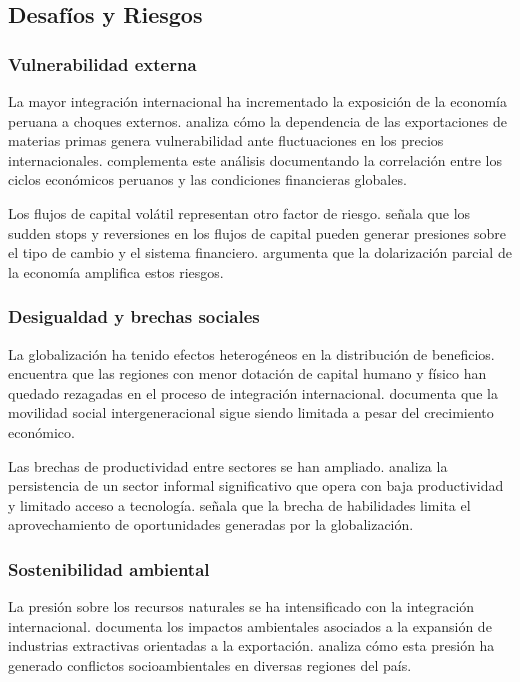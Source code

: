 \documentclass[12pt, a4paper]{article}
\begin{document}
\subsection{Desafíos y Riesgos}

\subsubsection{Vulnerabilidad externa}
La mayor integración internacional ha incrementado la exposición de la economía peruana a choques externos. \textcite{mendoza2021volatilidad} analiza cómo la dependencia de las exportaciones de materias primas genera vulnerabilidad ante fluctuaciones en los precios internacionales. \textcite{jimenez2020ciclos} complementa este análisis documentando la correlación entre los ciclos económicos peruanos y las condiciones financieras globales.

Los flujos de capital volátil representan otro factor de riesgo. \textcite{rossini2019politica} señala que los sudden stops y reversiones en los flujos de capital pueden generar presiones sobre el tipo de cambio y el sistema financiero. \textcite{cruz2021financiera} argumenta que la dolarización parcial de la economía amplifica estos riesgos.

\subsubsection{Desigualdad y brechas sociales}
La globalización ha tenido efectos heterogéneos en la distribución de beneficios. \textcite{herrera2020brechas} encuentra que las regiones con menor dotación de capital humano y físico han quedado rezagadas en el proceso de integración internacional. \textcite{yamada2021movilidad} documenta que la movilidad social intergeneracional sigue siendo limitada a pesar del crecimiento económico.

Las brechas de productividad entre sectores se han ampliado. \textcite{chacaltana2019dualidad} analiza la persistencia de un sector informal significativo que opera con baja productividad y limitado acceso a tecnología. \textcite{lavado2020skills} señala que la brecha de habilidades limita el aprovechamiento de oportunidades generadas por la globalización.

\subsubsection{Sostenibilidad ambiental}
La presión sobre los recursos naturales se ha intensificado con la integración internacional. \textcite{glave2021extractivas} documenta los impactos ambientales asociados a la expansión de industrias extractivas orientadas a la exportación. \textcite{pulgar2019conflictos} analiza cómo esta presión ha generado conflictos socioambientales en diversas regiones del país.
\end{document}
